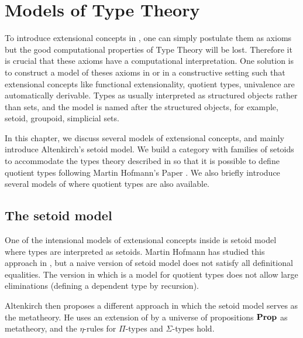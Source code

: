

\chapter{Models of Type Theory}\label{models}


To introduce extensional concepts in \itt, one can simply postulate them as axioms but the good computational properties of Type Theory will be lost. Therefore it is crucial that these axioms have 
a computational interpretation. One solution is to construct a model of theses axioms in \itt or in a constructive setting such that extensional concepts like functional extensionality, quotient types, univalence are automatically derivable. Types as usually interpreted as structured objects rather than sets, and the model is named after the structured objects, for example, setoid, groupoid, simplicial sets. 



In this chapter, we discuss several models of extensional concepts, and mainly introduce Altenkirch's setoid model. We build a category with families of setoids to accommodate the types theory described in
\cite{alti:lics99}  so that it is possible to define quotient types following Martin Hofmann's Paper \cite{hof:95:sm}. We also briefly introduce several models of \hott where quotient types are also available.

\section{The setoid model}


One of the intensional models of extensional concepts inside \itt is setoid model where types are interpreted as setoids. Martin Hofmann has studied this approach in \cite{hof:phd}, but a naive version of setoid model does not satisfy all definitional equalities. The version in \cite{DBLP:conf/tlca/Hofmann95} which is a model for quotient types does not allow large eliminations (defining a dependent type by recursion).

Altenkirch then proposes \cite{alti:lics99} a different approach in which the setoid model serves as the metatheory.
He uses an extension of \itt by a universe of propositions $\operatorname{\mathbf{Prop}}$ as metatheory, and the $\eta$-rules for $\Pi$-types and $\Sigma$-types hold. 

